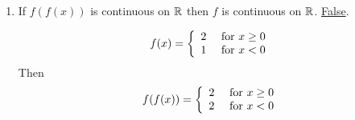 \begin{numedquestion}
\begin{enumerate}[label={(\arabic*)}]
      \item If $f(f(x))$ is continuous on $\mathbb{R}$ then $f$ is continuous on $\mathbb{R}$. \underline{False}.

            \[f(x) = \left\{\begin{array}{l l}
              2 &\text{ for } x \geq 0 \\
              1 &\text{ for } x < 0
            \end{array}\right.\]
            Then 
            \[f(f(x)) = \left\{\begin{array}{l l}
              2 &\text{ for } x \geq 0 \\
              2 &\text{ for } x < 0
            \end{array}\right.\]
  \end{enumerate}
  
  
\end{numedquestion}
  
